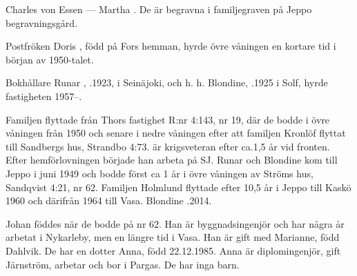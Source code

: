 Charles von Essen   ---  Martha . De är begravna i familjegraven på Jeppo begravningsgård.

Postfröken Doris , född på Fors hemman, hyrde övre våningen en kortare tid i början av 1950-talet.

Bokhållare Runar , .1923, i Seinäjoki, och h. h. Blondine, .1925 i Solf, hyrde fastigheten 1957--.
\begin{jhchildren}
  \item {}
  \item {}
\end{jhchildren}
Familjen flyttade från Thors fastighet R:nr 4:143, nr 19, där de bodde i övre våningen från 1950 och senare i nedre våningen efter att familjen Kronlöf flyttat till Sandbergs hus, Strandbo 4:73.  är krigsveteran efter ca.1,5 år vid fronten. Efter hemförlovningen började han arbeta på SJ. Runar och Blondine kom till Jeppo i juni 1949 och bodde först ca 1 år i övre våningen av Ströms hus, Sandqvist 4:21, nr 62. Familjen Holmlund flyttade efter 10,5 år i Jeppo till Kaskö 1960 och därifrån 1964 till Vasa. Blondine .2014.

Johan föddes när de bodde på nr 62. Han är byggnadsingenjör och har några år arbetat i Nykarleby, men en längre tid i Vasa. Han är gift med Marianne, född Dahlvik. De har en dotter Anna, född 22.12.1985. Anna är diplomingenjör, gift Järnström, arbetar och bor i Pargas. De har inga barn.



